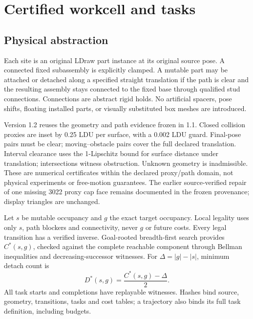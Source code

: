 \documentclass[10pt,twocolumn]{article}
\begin{document}
\section{Certified workcell and tasks}
\subsection{Physical abstraction}
Each site is an original LDraw part instance at its original source pose.
A connected fixed subassembly is explicitly clamped. A mutable part may be
attached or detached along a specified straight translation if the path is
clear and the resulting assembly stays connected to the fixed base through
qualified stud connections. Connections are abstract rigid holds.
No artificial spacers, pose shifts, floating installed parts, or visually
substituted box meshes are introduced.

Version 1.2 reuses the geometry and path evidence frozen in 1.1. Closed
collision proxies are inset by 0.25 LDU per surface, with a 0.002 LDU guard.
Final-pose pairs must be clear; moving--obstacle pairs cover the full declared
translation. Interval clearance uses the 1-Lipschitz bound for surface
distance under translation; intersections witness obstruction. Unknown
geometry is inadmissible. These are numerical certificates within the
declared proxy/path domain, not physical experiments or free-motion guarantees.
The earlier source-verified repair of one missing 3022 proxy cap face remains
documented in the frozen provenance; display triangles are unchanged.

Let $s$ be mutable occupancy and $g$ the exact target occupancy. Local legality
uses only $s$, path blockers and connectivity, never $g$ or future costs.
Every legal transition has a verified inverse. Goal-rooted breadth-first search
provides $C^*(s,g)$, checked against the complete reachable component through
Bellman inequalities and decreasing-successor witnesses.
For $\Delta=|g|-|s|$, minimum detach count is
\[
D^*(s,g)=\frac{C^*(s,g)-\Delta}{2}.
\]
All task starts and completions have replayable witnesses. Hashes bind source,
geometry, transitions, tasks and cost tables; a trajectory also binds its full
task definition, including budgets.

\begin{table}[t]
\centering\small
\caption{Certified bank and new partial-target reconfiguration episodes.
$C^*$ and $D^*$ refer to the reconfiguration start, not the full-build task.
Hamming distance counts initially mismatched sites.}

\label{tab:cases}
\end{table}
\end{document}

